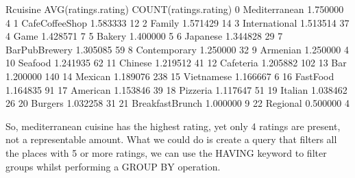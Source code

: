 \documentclass[letterpaper,10pt,english]{jupyterBook}
\begin{document}
\begin{sphinxVerbatim}[commandchars=\\\{\}]
            Rcuisine  AVG(ratings.rating)  COUNT(ratings.rating)
0      Mediterranean             1.750000                      4
1   Cafe\PYGZhy{}Coffee\PYGZus{}Shop             1.583333                     12
2             Family             1.571429                     14
3      International             1.513514                     37
4               Game             1.428571                      7
5             Bakery             1.400000                      5
6           Japanese             1.344828                     29
7    Bar\PYGZus{}Pub\PYGZus{}Brewery             1.305085                     59
8       Contemporary             1.250000                     32
9           Armenian             1.250000                      4
10           Seafood             1.241935                     62
11           Chinese             1.219512                     41
12         Cafeteria             1.205882                    102
13               Bar             1.200000                    140
14           Mexican             1.189076                    238
15        Vietnamese             1.166667                      6
16         Fast\PYGZus{}Food             1.164835                     91
17          American             1.153846                     39
18          Pizzeria             1.117647                     51
19           Italian             1.038462                     26
20           Burgers             1.032258                     31
21  Breakfast\PYGZhy{}Brunch             1.000000                      9
22          Regional             0.500000                      4
\end{sphinxVerbatim}

\sphinxAtStartPar
So, mediterranean cuisine has the highest rating, yet only 4 ratings are present, not a representable amount.
What we could do is create a query that filters all the places with 5 or more ratings, we can use the HAVING keyword to filter groups whilst performing a GROUP BY operation.

\begin{sphinxVerbatim}[commandchars=\\\{\}]
  
\end{sphinxVerbatim}
\end{document}
